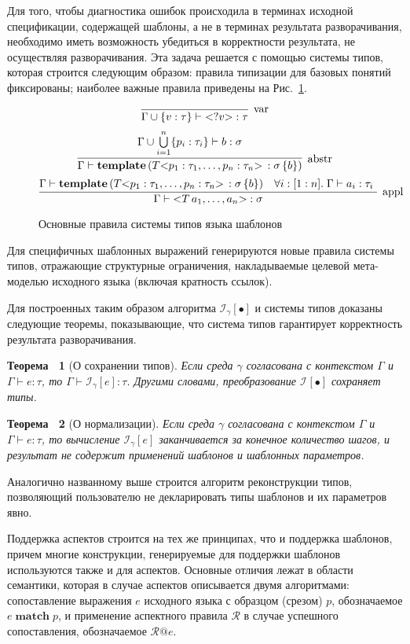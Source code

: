 \documentclass[12pt,a4paper]{article}
\makeatletter
\newcommand{\figref}[1]{Рис.~\ref{#1}}
\theoremstyle{definition}
\theoremstyle{plain}
\newtheorem{Th}{Теорема~}[part]
\newcommand{\Inst}[2]{\mathcal{I}_{#1} \left[ #2 \right]}%
\newcommand{\trule}[3]{%
\infer[\mbox{#3}]{#2}{#1}%
}
\newcommand{\ang}[1]{\mathsf{<}#1\mathsf{>}}
\newcommand{\match}[2]{#1 \; \mathbf{match} \; #2}
\newcommand{\rapply}[2]{#1@#2}
\makeatother
\begin{document}
Для того, чтобы диагностика ошибок происходила в терминах исходной спецификации, содержащей шаблоны, а не в терминах результата разворачивания, необходимо иметь возможность убедиться в корректности результата, не осуществляя разворачивания. Эта задача решается с помощью системы типов, которая строится следующим образом: правила типизации для базовых понятий фиксированы; наиболее важные правила приведены на \figref{TmpTypes}.
\begin{figure}[htbp]
	\centering
$$
\trule{}{\Gamma \cup \{v : \tau\} \vdash \ang{?v} : \tau}{var}
$$ 
$$
\trule{
	\Gamma \cup \bigcup\limits_{i=1}^{n} \{ p_i : \tau_i \} \vdash b : \sigma
}{
	\Gamma \vdash \mathbf{template}\left(
		T \ang{p_1 : \tau_1, \ldots, p_n : \tau_n} \,: \sigma \, \{ b \}
	\right)
}{abstr}
$$ 
$$
\trule{
	\Gamma \vdash \mathbf{template}\left(
		T \ang{p_1 : \tau_1, \ldots, p_n : \tau_n} \,: \sigma \, \{ b \}
	\right)
	&
	\forall i : [1:n].\; \Gamma \vdash a_i : \tau_i \
}{
	\Gamma \vdash \ang{T \, a_1, \ldots, a_n} : \sigma
}{appl}
$$
	\caption{Основные правила системы типов языка шаблонов}\label{TmpTypes}
\end{figure}
Для специфичных шаблонных выражений генерируются новые правила системы типов, отражающие структурные ограничения, накладываемые целевой мета-моделью исходного языка (включая кратность ссылок).

Для построенных таким образом алгоритма $\Inst{\gamma}{\bullet}$ и системы типов доказаны следующие теоремы, показывающие, что система типов гарантирует корректность результата разворачивания.

\begin{Th}[О сохранении типов]
Если среда $\gamma$ согласована с контекстом $\Gamma$ и $\Gamma \vdash e : \tau$, то $\Gamma \vdash \Inst{\gamma}{e} : \tau$. Другими словами, преобразование $\Inst{}{\bullet}$ сохраняет типы.
\end{Th}

\begin{Th}[О нормализации]
Если среда $\gamma$ согласована с контекстом $\Gamma$ и $\Gamma \vdash e : \tau$, то вычисление $\Inst{\gamma}{e}$ заканчивается за конечное количество шагов, и результат не содержит применений шаблонов и шаблонных параметров.
\end{Th}

Аналогично названному выше строится алгоритм реконструкции типов, позволяющий пользователю не декларировать типы шаблонов и их параметров явно.

Поддержка аспектов строится на тех же принципах, что и поддержка шаблонов, причем многие конструкции, генерируемые для поддержки шаблонов используются также и для аспектов. Основные отличия лежат в области семантики, которая в случае аспектов описывается двумя алгоритмами: сопоставление выражения $e$ исходного языка с образцом (срезом) $p$, обозначаемое $\match{e}{p}$, и применение аспектного правила $\mathcal{R}$ в случае успешного сопоставления, обозначаемое $\rapply{\mathcal{R}}{e}$.
\end{document}
